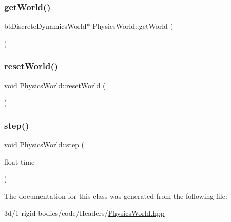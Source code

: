 \mbox{\label{class_physics_world_a494deb5de66fb39a88ebccf48fc9c169}} 
\subsubsection{\texorpdfstring{get\+World()}{getWorld()}}
{\footnotesize\ttfamily bt\+Discrete\+Dynamics\+World$\ast$ Physics\+World\+::get\+World (\begin{DoxyParamCaption}{ }\end{DoxyParamCaption})\hspace{0.3cm}{\ttfamily [inline]}}

\mbox{\label{class_physics_world_a99a91339a05c64b602031fe899245777}} 
\subsubsection{\texorpdfstring{reset\+World()}{resetWorld()}}
{\footnotesize\ttfamily void Physics\+World\+::reset\+World (\begin{DoxyParamCaption}{ }\end{DoxyParamCaption})\hspace{0.3cm}{\ttfamily [inline]}}

\mbox{\label{class_physics_world_a37e286968a0f32f62d8a387253490a02}} 
\subsubsection{\texorpdfstring{step()}{step()}}
{\footnotesize\ttfamily void Physics\+World\+::step (\begin{DoxyParamCaption}\item[{float}]{time }\end{DoxyParamCaption})\hspace{0.3cm}{\ttfamily [inline]}}



The documentation for this class was generated from the following file\+:\begin{DoxyCompactItemize}
\item 
3d/1 rigid bodies/code/\+Headers/\mbox{\hyperlink{_physics_world_8hpp}{Physics\+World.\+hpp}}\end{DoxyCompactItemize}

